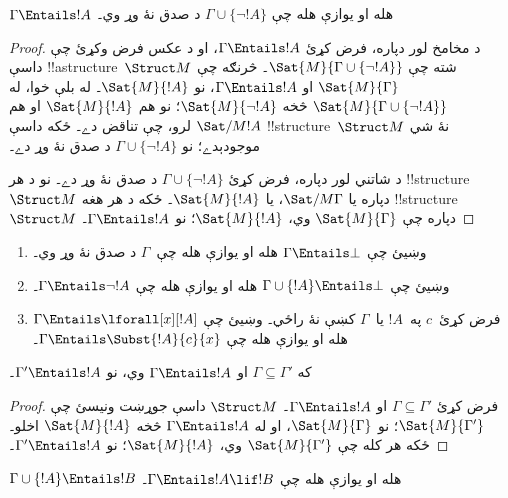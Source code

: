 \documentclass[../../../include/open-logic-section]{subfiles}
\begin{document}
\begin{prop}
$\Gamma \Entails !A$ هله او يوازې هله چې
$\Gamma \cup \{\lnot !A\}$ د صدق نۀ وړ وي۔
\end{prop}

\begin{proof}
د مخامخ لور دپاره، فرض کړئ $\Gamma \Entails !A$، او د عکس فرض وکړئ
چې داسې !!a{structure}~$\Struct M$ شته چې
$\Sat{M}{\Gamma \cup \{ \lnot !A \}}$۔ څرنګه چې
$\Sat{M}{\Gamma}$ او $\Gamma \Entails !A$، نو $\Sat{M}{!A}$۔
له بلې خوا، له $\Sat{M}{\Gamma\cup \{ \lnot !A \}}$ څخه
$\Sat{M}{\lnot !A}$؛ نو هم $\Sat{M}{!A}$ او هم $\Sat/{M}{!A}$ لرو،
چې تناقض دے۔ ځکه داسې !!{structure}~$\Struct M$ نۀ شي موجودېدے؛ نو
$\Gamma \cup \{ \lnot !A \}$ د صدق نۀ وړ دے۔

د شاتني لور دپاره، فرض کړئ $\Gamma \cup \{ \lnot !A \}$ د صدق نۀ وړ
دے۔ نو د هر !!{structure}~$\Struct M$ دپاره يا
$\Sat/{M}{\Gamma}$، يا $\Sat{M}{!A}$۔ ځکه د هر هغه
!!{structure}~$\Struct M$ دپاره چې $\Sat{M}{\Gamma}$ وي،
$\Sat{M}{!A}$؛ نو $\Gamma \Entails !A$۔
\end{proof}

\begin{prob}
\begin{enumerate}
\item وښيئ چې $\Gamma \Entails \bot$ هله او يوازې هله چې~$\Gamma$ د
صدق نۀ وړ وي۔
\item وښيئ چې $\Gamma \cup \{!A\} \Entails \bot$ هله او يوازې هله چې
$\Gamma \Entails \lnot !A$۔
\item فرض کړئ~$c$ په~$!A$ يا~$\Gamma$ کښې نۀ راځي۔ وښيئ چې
  $\Gamma \Entails \lforall[x][!A]$ هله او يوازې هله چې
  $\Gamma \Entails \Subst{!A}{c}{x}$۔
\end{enumerate}
\end{prob}

\begin{prop}
که $\Gamma \subseteq \Gamma'$ او $\Gamma \Entails !A$ وي، نو
$\Gamma' \Entails !A$۔
\end{prop}

\begin{proof}
فرض کړئ $\Gamma \subseteq \Gamma'$ او $\Gamma \Entails !A$۔
$\Struct M$ داسې جوړښت ونيسئ چې $\Sat{M}{\Gamma'}$؛ نو
$\Sat{M}{\Gamma}$، او له $\Gamma \Entails !A$ څخه
$\Sat{M}{!A}$ اخلو۔ ځکه هر کله چې $\Sat{M}{\Gamma'}$ وي،
$\Sat{M}{!A}$؛ نو $\Gamma' \Entails !A$۔
\end{proof}


\begin{thm}
$\Gamma \cup \{!A\} \Entails !B$ هله او يوازې هله چې
$\Gamma \Entails !A \lif !B$۔
\end{thm}
\end{document}
